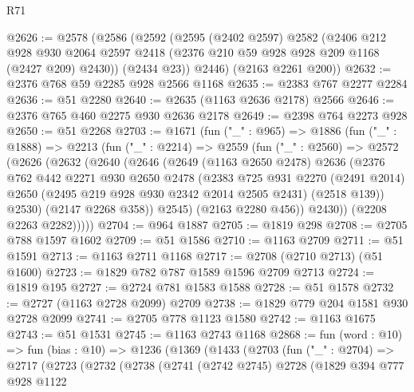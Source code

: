 \begin{lexlean}{R71}
\begin{coremodule}
@2626 := @2578
    (@2586
      (@2592
        (@2595
          (@2402 @2597)
          @2582
          (@2406
            @212
            @928
            @930
            @2064
            @2597
            @2418
            (@2376 @210 @59 @928 @928 @209 @1168 (@2427 @209) @2430))
          (@2434 @23))
        @2446)
      (@2163 @2261 @200))
@2632 := @2376 @768 @59 @2285 @928 @2566 @1168
@2635 := @2383 @767 @2277 @2284
@2636 := @51 @2280
@2640 := @2635 (@1163 @2636 @2178) @2566
@2646 := @2376 @765 @460 @2275 @930 @2636 @2178
@2649 := @2398 @764 @2273 @928
@2650 := @51 @2268
@2703 := @1671
    (fun ("_" : @965) =>
    @1886
      (fun ("_" : @1888) =>
      @2213
        (fun ("_" : @2214) =>
        @2559
          (fun ("_" : @2560) =>
          @2572
            (@2626
              (@2632
                (@2640
                  (@2646
                    (@2649
                      (@1163 @2650 @2478)
                      @2636
                      (@2376
                        @762
                        @442
                        @2271
                        @930
                        @2650
                        @2478
                        (@2383
                          @725
                          @931
                          @2270
                          (@2491 @2014)
                          @2650
                          (@2495 @219 @928 @930 @2342 @2014 @2505 @2431)
                          (@2518 @139))
                        @2530)
                      (@2147 @2268 @358))
                    @2545)
                  (@2163 @2280 @456))
                @2430))
            (@2208 @2263 @2282)))))
@2704 := @964 @1887
@2705 := @1819 @298
@2708 := @2705 @788 @1597 @1602
@2709 := @51 @1586
@2710 := @1163 @2709
@2711 := @51 @1591
@2713 := @1163 @2711 @1168
@2717 := @2708 (@2710 @2713) (@51 @1600)
@2723 := @1829 @782 @787 @1589 @1596 @2709 @2713
@2724 := @1819 @195
@2727 := @2724 @781 @1583 @1588
@2728 := @51 @1578
@2732 := @2727 (@1163 @2728 @2099) @2709
@2738 := @1829 @779 @204 @1581 @930 @2728 @2099
@2741 := @2705 @778 @1123 @1580
@2742 := @1163 @1675
@2743 := @51 @1531
@2745 := @1163 @2743 @1168
@2868 := fun (word : @10) =>
  fun (bias : @10) =>
  @1236
    (@1369
      (@1433
        (@2703
          (fun ("_" : @2704) =>
          @2717
            (@2723
              (@2732
                (@2738
                  (@2741
                    (@2742 @2745)
                    @2728
                    (@1829
                      @394
                      @777
                      @928
                      @1122

\end{coremodule}
\end{lexlean}
